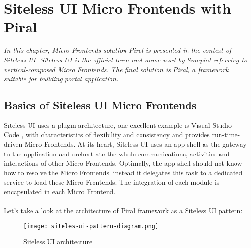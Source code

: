 \documentclass[a4paper]{book}
\begin{document}


\chapter{Siteless UI Micro Frontends with Piral}
\textit{In this chapter, Micro Frontends solution Piral is presented in the context of Siteless UI. Siteless UI is the official term and name used by Smapiot referring to vertical-composed Micro Frontends. The final solution is Piral, a framework suitable for building portal application.} \cite{Piral}
\section{Basics of Siteless UI Micro Frontends}
Siteless UI uses a plugin architecture, one excellent example is Visual Studio Code \cite{VSCode}, with characteristics of flexibility and consistency and provides run-time-driven Micro Frontends. At its heart, Siteless UI uses an app-shell as the gateway to the application and orchestrate the whole communications, activities and interactions of other Micro Frontends. Optimally, the app-shell should not know how to resolve the Micro Frontends, instead it delegates this task to a dedicated service to load these Micro Frontends. The integration of each module is encapsulated in each Micro Frontend. 
\\ \\ 
Let’s take a look at the architecture of Piral framework as a Siteless UI pattern:
\begin{figure}[h!]
    \centering
    \captionsetup{justification=centering}
    \texttt{[image: siteles-ui-pattern-diagram.png]}
    \caption{Siteless UI architecture \cite{Rap20}}
    \label{fig:siteles-ui-pattern-diagram}
\end{figure}
\end{document}
